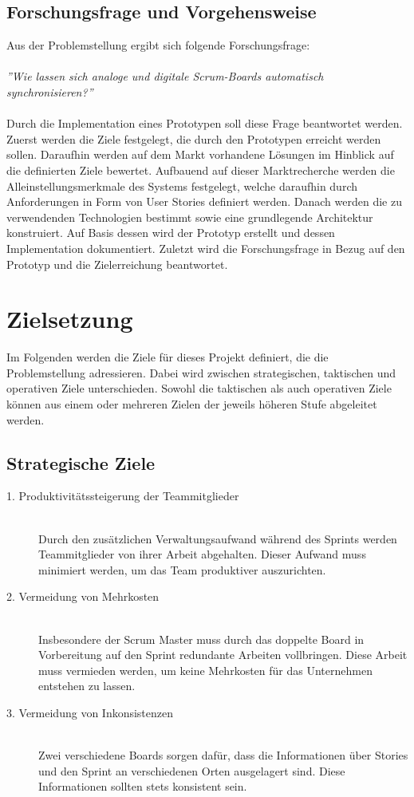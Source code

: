 \documentclass[12pt,titlepage]{scrartcl}
\begin{document}
		\subsection{Forschungsfrage und Vorgehensweise}
		Aus der Problemstellung ergibt sich folgende Forschungsfrage: \\ \\
		\textit{''Wie lassen sich analoge und digitale Scrum-Boards automatisch synchronisieren?''} \\ \\
		Durch die Implementation eines Prototypen soll diese Frage beantwortet werden. Zuerst werden die Ziele festgelegt, die durch den Prototypen erreicht werden sollen. Daraufhin werden auf dem Markt vorhandene Lösungen im Hinblick auf die definierten Ziele bewertet. Aufbauend auf dieser Marktrecherche werden die Alleinstellungsmerkmale des Systems festgelegt, welche daraufhin durch Anforderungen in Form von User Stories definiert werden. Danach werden die zu verwendenden Technologien bestimmt sowie eine grundlegende Architektur konstruiert. Auf Basis dessen wird der Prototyp erstellt und dessen Implementation dokumentiert. Zuletzt wird die Forschungsfrage in Bezug auf den Prototyp und die Zielerreichung beantwortet.
	\newpage	
	\section{Zielsetzung} \label{Zielsetzung}
	Im Folgenden werden die Ziele für dieses Projekt definiert, die die Problemstellung adressieren. Dabei wird zwischen strategischen, taktischen und operativen Ziele unterschieden. Sowohl die taktischen als auch operativen Ziele können aus einem oder mehreren Zielen der jeweils höheren Stufe abgeleitet werden.
		\subsection{Strategische Ziele}
		\begin{description}
 			\item[1. Produktivitätssteigerung der Teammitglieder] \hfill \\
 			Durch den zusätzlichen Verwaltungsaufwand während des Sprints werden Teammitglieder von ihrer Arbeit abgehalten. Dieser Aufwand muss minimiert werden, um das Team produktiver auszurichten.
 			\item[2. Vermeidung von Mehrkosten] \hfill \\
 			Insbesondere der Scrum Master muss durch das doppelte Board in Vorbereitung auf den Sprint redundante Arbeiten vollbringen. Diese Arbeit muss vermieden werden, um keine Mehrkosten für das Unternehmen entstehen zu lassen.
 			\item[3. Vermeidung von Inkonsistenzen] \hfill \\
 			Zwei verschiedene Boards sorgen dafür, dass die Informationen über Stories und den Sprint an verschiedenen Orten ausgelagert sind. Diese Informationen sollten stets konsistent sein. 
		\end{description}
\end{document}
